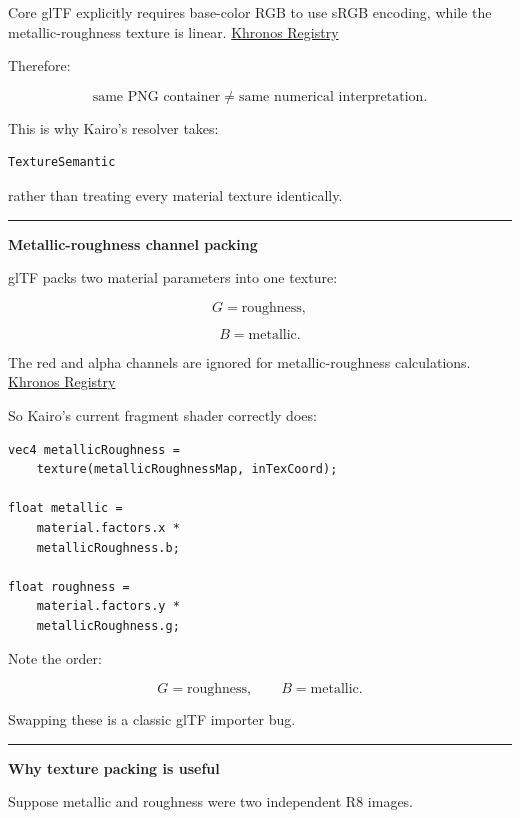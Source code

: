 Core glTF explicitly requires base-color RGB to use sRGB encoding, while the metallic-roughness texture is linear. \href{https://registry.khronos.org/glTF/specs/2.0/glTF-2.0.html?utm_source=chatgpt.com}{Khronos Registry}

Therefore:

\[
\boxed{
\text{same PNG container}
\neq
\text{same numerical interpretation}.
}
\]

This is why Kairo's resolver takes:

\begin{verbatim}
TextureSemantic
\end{verbatim}

rather than treating every material texture identically.

\begin{center}\rule{0.5\linewidth}{0.5pt}\end{center}

\textbf{Metallic-roughness channel packing}

glTF packs two material parameters into one texture:

\[
G=\text{roughness},
\]

\[
B=\text{metallic}.
\]

The red and alpha channels are ignored for metallic-roughness calculations. \href{https://registry.khronos.org/glTF/specs/2.0/glTF-2.0.html?utm_source=chatgpt.com}{Khronos Registry}

So Kairo's current fragment shader correctly does:

\begin{verbatim}
vec4 metallicRoughness =
    texture(metallicRoughnessMap, inTexCoord);

float metallic =
    material.factors.x *
    metallicRoughness.b;

float roughness =
    material.factors.y *
    metallicRoughness.g;
\end{verbatim}

Note the order:

\[
\boxed{
G=\text{roughness},\qquad B=\text{metallic}.
}
\]

Swapping these is a classic glTF importer bug.

\begin{center}\rule{0.5\linewidth}{0.5pt}\end{center}

\textbf{Why texture packing is useful}

Suppose metallic and roughness were two independent R8 images.

